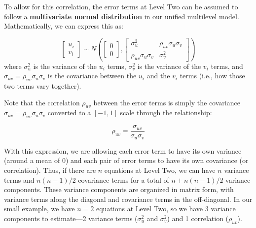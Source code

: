 \documentclass[
]{krantz}
\begin{document}
To allow for this correlation, the error terms at Level Two can be assumed to follow a \textbf{multivariate normal distribution}  in our unified multilevel model. Mathematically, we can express this as:

\begin{equation*} 
\left[ \begin{array}{c}
            u_{i} \\ v_{i}
          \end{array}  \right] \sim N \left( \left[
          \begin{array}{c}
            0 \\ 0
          \end{array} \right], \left[
          \begin{array}{cc}
            \sigma_{u}^{2} & \rho_{uv}\sigma_{u}\sigma_v \\
            \rho_{uv}\sigma_{u}\sigma_v & \sigma_{v}^{2}
          \end{array} \right] \right) 
\end{equation*}
where \(\sigma_{u}^{2}\) is the variance of the \(u_{i}\) terms, \(\sigma_{v}^{2}\) is the variance of the \(v_{i}\) terms, and \(\sigma_{uv} = \rho_{uv}\sigma_{u}\sigma_v\) is the covariance between the \(u_{i}\) and the \(v_{i}\) terms (i.e., how those two terms vary together).

Note that the correlation \(\rho_{uv}\) between the error terms is simply the covariance \(\sigma_{uv}=\rho_{uv}\sigma_{u}\sigma_{v}\) converted to a \([-1,1]\) scale through the relationship:

\begin{equation*}
\rho_{uv} = \frac{\sigma_{uv}}{\sigma_{u}\sigma_{v}}
\end{equation*}

With this expression, we are allowing each error term to have its own variance (around a mean of 0) and each pair of error terms to have its own covariance (or correlation). Thus, if there are \(n\) equations at Level Two, we can have \(n\) variance terms and \(n(n-1)/2\) covariance terms for a total of \(n + n(n-1)/2\) variance components. These variance components are organized in matrix form, with variance terms along the diagonal and covariance terms in the off-diagonal. In our small example, we have \(n=2\) equations at Level Two, so we have 3 variance components to estimate---2 variance terms (\(\sigma_{u}^{2}\) and \(\sigma_{v}^{2}\)) and 1 correlation (\(\rho_{uv}\)).
\end{document}
